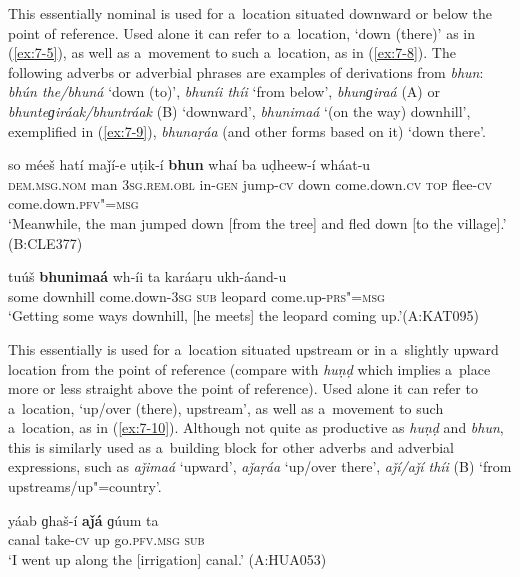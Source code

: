  This essentially nominal  is used for a~location situated downward or below the point of reference. Used alone it can refer to a~location, `down (there)' as in (\ref{ex:7-5}), as well as a~movement to such a~location, as in (\ref{ex:7-8}). The following adverbs or adverbial phrases are examples of derivations from \textit{bhun}: \textit{bhún the/bhuná} `down (to)', \textit{bhuníi thíi} `from below', \textit{bhunɡiraá} (A) or \textit{bhunteɡiráak/bhuntráak} (B) `downward', \textit{bhunimaá} `(on the way) downhill', exemplified in (\ref{ex:7-9}), \textit{bhunaṛáa} (and other  forms based on it) `down there'.

\largerpage
\begin{exe}
\ex
\label{ex:7-8}
\gll so méeš hatí maǰí-e uṭik-í \textbf{bhun}  whaí ba uḍheew-í wháat-u\\
\textsc{dem.msg.nom} man \textsc{3sg.rem.obl} in-\textsc{gen} jump-\textsc{cv} down
come.down.\textsc{cv} \textsc{top} flee-\textsc{cv} come.down.\textsc{pfv"=msg} \\
\glt `Meanwhile, the man jumped down [from the tree] and fled down [to the village].' (B:CLE377)

\ex
\label{ex:7-9}
\gll tuúš \textbf{bhunimaá} wh-íi ta karáaṛu  ukh-áand-u \\
some downhill  come.down-\textsc{3sg} \textsc{sub} leopard come.up-\textsc{prs"=msg} \\
\glt `Getting some ways downhill, [he meets] the leopard coming up.'\newline (A:KAT095)
\end{exe}

 This essentially   is used for a~location situated upstream or in a~slightly upward location from the point of reference (compare with \textit{huṇḍ} which implies a~place more or less straight above the point of reference). Used alone it can refer to a~location, `up/over (there), upstream', as well as a~movement to such a~location, as in (\ref{ex:7-10}). Although not quite as productive as \textit{huṇḍ} and \textit{bhun}, this  is similarly used as a~building block for other adverbs and adverbial expressions, such as \textit{aǰimaá} `upward', \textit{aǰaṛáa} `up/over there', \textit{aǰí/aǰí thíi} (B) `from upstreams/up"=country'.

\begin{exe}
\ex
\label{ex:7-10}
\gll yáab ɡhaš-í \textbf{aǰá} ɡúum ta  \\
canal take-\textsc{cv} up go.\textsc{pfv.msg} \textsc{sub} \\
\glt `I went up along the [irrigation] canal.' (A:HUA053)
\end{exe}

